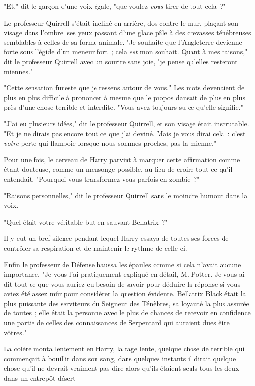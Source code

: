 "Et," dit le garçon d'une voix égale, "que voulez-\emph{vous} tirer de tout cela~?"

Le professeur Quirrell s'était incliné en arrière, dos contre le mur, plaçant son visage dans l'ombre, ses yeux passant d'une glace pâle à des crevasses ténébreuses semblables à celles de sa forme animale. "Je souhaite que l'Angleterre devienne forte sous l'égide d'un meneur fort~; cela \emph{est} mon souhait. Quant à mes raisons," dit le professeur Quirrell avec un sourire sans joie, "je pense qu'elles resteront miennes."

"Cette sensation funeste que je ressens autour de vous." Les mots devenaient de plus en plus difficile à prononcer à mesure que le propos dansait de plus en plus près d'une chose terrible et interdite. "Vous avez toujours su ce qu'elle signifie."

"J'ai eu plusieurs idées," dit le professeur Quirrell, et son visage était inscrutable. "Et je ne dirais pas encore tout ce que j'ai deviné. Mais je vous dirai cela~: c'est \emph{votre} perte qui flamboie lorsque nous sommes proches, pas la mienne."

Pour une fois, le cerveau de Harry parvint à marquer cette affirmation comme étant douteuse, comme un mensonge possible, au lieu de croire tout ce qu'il entendait. "Pourquoi vous transformez-vous parfois en zombie~?"

"Raisons personnelles," dit le professeur Quirrell sans le moindre humour dans la voix.

"Quel était votre véritable but en sauvant Bellatrix~?"

Il y eut un bref silence pendant lequel Harry essaya de toutes ses forces de contrôler sa respiration et de maintenir le rythme de celle-ci.

Enfin le professeur de Défense haussa les épaules comme si cela n'avait aucune importance. "Je vous l'ai pratiquement expliqué en détail, M. Potter. Je vous ai dit tout ce que vous auriez eu besoin de savoir pour déduire la réponse si vous aviez été assez mûr pour considérer la question évidente. Bellatrix Black était la plus puissante des serviteurs du Seigneur des Ténèbres, sa loyauté la plus assurée de toutes~; elle était la personne avec le plus de chances de recevoir en confidence une partie de celles des connaissances de Serpentard qui auraient dues être vôtres."

La colère monta lentement en Harry, la rage lente, quelque chose de terrible qui commençait à bouillir dans son sang, dans quelques instants il dirait quelque chose qu'il ne devrait vraiment pas dire alors qu'ils étaient seuls tous les deux dans un entrepôt désert -


